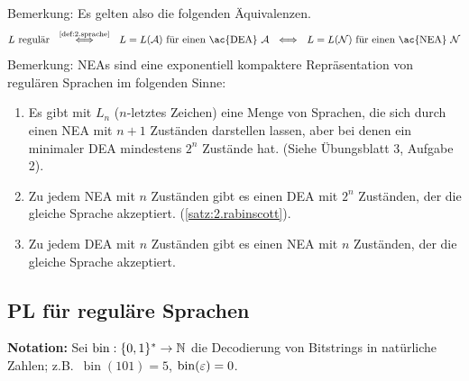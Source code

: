 Bemerkung: Es gelten also die folgenden Äquivalenzen.
\[
L \text{ regulär} 
\ \ \stackrel{\text{\autoref{def:2.sprache}}}{\Longleftrightarrow} \ \ L = L(\A) \text{ für einen \ac{DEA} }\A
\ \ \Longleftrightarrow \ \ L = L(\calN) \text{ für einen \ac{NEA} }\calN
\]
Bemerkung: \ac{NEA}s sind eine exponentiell kompaktere Repräsentation von regulären Sprachen im folgenden Sinne:
\begin{enumerate}
 \item Es gibt mit $L_n$ ($n$-letztes Zeichen) eine Menge von Sprachen, die sich durch einen \ac{NEA} mit $n+1$ Zuständen darstellen lassen, aber bei denen ein minimaler \ac{DEA} mindestens $2^n$ Zustände hat. (Siehe Übungsblatt 3, Aufgabe 2).
 \item Zu jedem \ac{NEA} mit $n$ Zuständen gibt es einen \ac{DEA} mit $2^n$ Zuständen, der die gleiche Sprache akzeptiert. (\autoref{satz:2.rabinscott}).
 \item Zu jedem \ac{DEA} mit $n$ Zuständen gibt es einen \ac{NEA} mit $n$ Zuständen, der die gleiche Sprache akzeptiert.
\end{enumerate}


\subsection{\acf{PL} für reguläre Sprachen}
\label{sec:regpl}

\textbf{Notation:} Sei $\operatorname{bin}:\{0,1\}^*\rightarrow \mathbb{N}$ die Decodierung von Bitstrings in natürliche Zahlen;
z.B.\ $\operatorname{bin}(101) = 5$, $\operatorname{bin}(\varepsilon) = 0$.

